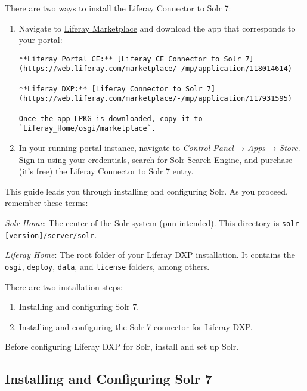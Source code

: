 \noindent\hrulefill

There are two ways to install the Liferay Connector to Solr 7:

\begin{enumerate}
\def\labelenumi{\arabic{enumi}.}
\item
  Navigate to \href{https://web.liferay.com/marketplace/}{Liferay
  Marketplace} and download the app that corresponds to your portal:

\begin{verbatim}
**Liferay Portal CE:** [Liferay CE Connector to Solr 7](https://web.liferay.com/marketplace/-/mp/application/118014614) 

**Liferay DXP:** [Liferay Connector to Solr 7](https://web.liferay.com/marketplace/-/mp/application/117931595)

Once the app LPKG is downloaded, copy it to
`Liferay_Home/osgi/marketplace`.
\end{verbatim}
\item
  In your running portal instance, navigate to \emph{Control Panel} →
  \emph{Apps} → \emph{Store}. Sign in using your credentials, search for
  Solr Search Engine, and purchase (it's free) the Liferay Connector to
  Solr 7 entry.
\end{enumerate}

This guide leads you through installing and configuring Solr. As you
proceed, remember these terms:

\emph{Solr Home}: The center of the Solr system (pun intended). This
directory is \texttt{solr-{[}version{]}/server/solr}.

\emph{Liferay Home}: The root folder of your Liferay DXP installation.
It contains the \texttt{osgi}, \texttt{deploy}, \texttt{data}, and
\texttt{license} folders, among others.

There are two installation steps:

\begin{enumerate}
\def\labelenumi{\arabic{enumi}.}
\item
  Installing and configuring Solr 7.
\item
  Installing and configuring the Solr 7 connector for Liferay DXP.
\end{enumerate}

Before configuring Liferay DXP for Solr, install and set up Solr.

\subsection{Installing and Configuring Solr
7}\label{installing-and-configuring-solr-7}

